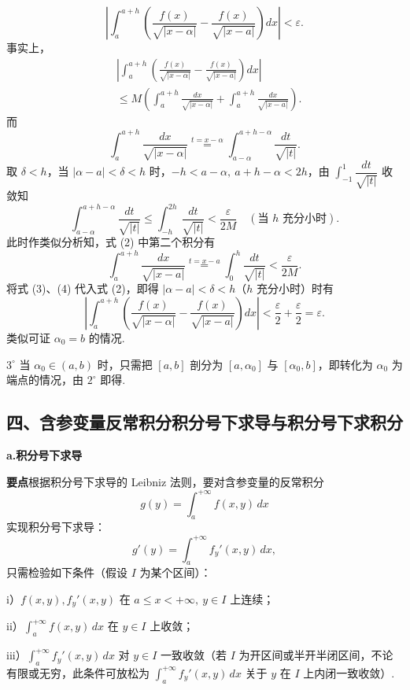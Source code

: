 \documentclass[UTF8,12pt,a4paper,fontset=fandol]{ctexart}
\begin{document}
\[
\left|\int_a^{a+h}\left(\frac{f(x)}{\sqrt{|x-\alpha|}}-\frac{f(x)}{\sqrt{|x-a|}}\right)dx\right|<\varepsilon.
\]
事实上，
\[
\begin{aligned}
&\left|\int_a^{a+h}\left(\frac{f(x)}{\sqrt{|x-\alpha|}}-\frac{f(x)}{\sqrt{|x-a|}}\right)dx\right|\\
&\le M\left(\int_a^{a+h}\frac{dx}{\sqrt{|x-\alpha|}}+\int_a^{a+h}\frac{dx}{\sqrt{|x-a|}}\right).
\end{aligned}
\tag{2}
\]
而
\[
\int_a^{a+h}\frac{dx}{\sqrt{|x-\alpha|}}
\overset{t=x-\alpha}{=}\int_{a-\alpha}^{a+h-\alpha}\frac{dt}{\sqrt{|t|}}.
\]
取 $\delta<h$，当 $|\alpha-a|<\delta<h$ 时，$-h<a-\alpha,\ a+h-\alpha<2h$，由 $\displaystyle\int_{-1}^{1}\dfrac{dt}{\sqrt{|t|}}$ 收敛知
\[
\int_{a-\alpha}^{a+h-\alpha}\frac{dt}{\sqrt{|t|}}
\le\int_{-h}^{2h}\frac{dt}{\sqrt{|t|}}<\frac{\varepsilon}{2M}\quad(\text{当 }h\text{ 充分小时}).
\tag{3}
\]
此时作类似分析知，式 (2) 中第二个积分有
\[
\int_a^{a+h}\frac{dx}{\sqrt{|x-a|}}
\overset{t=x-a}{=}\int_0^h\frac{dt}{\sqrt{|t|}}<\frac{\varepsilon}{2M}.
\tag{4}
\]
将式 (3)、(4) 代入式 (2)，即得 $|\alpha-a|<\delta<h$（$h$ 充分小时）时有
\[
\left|\int_a^{a+h}\left(\frac{f(x)}{\sqrt{|x-\alpha|}}-\frac{f(x)}{\sqrt{|x-a|}}\right)dx\right|<\frac{\varepsilon}{2}+\frac{\varepsilon}{2}=\varepsilon.
\]
类似可证 $\alpha_0=b$ 的情况.

$3^\circ$ 当 $\alpha_0\in(a,b)$ 时，只需把 $[a,b]$ 剖分为 $[a,\alpha_0]$ 与 $[\alpha_0,b]$，即转化为 $\alpha_0$ 为端点的情况，由 $2^\circ$ 即得.

\subsection*{四、含参变量反常积分积分号下求导与积分号下求积分}

\noindent\textbf{a.\quad 积分号下求导}

\noindent\textbf{要点}\quad 根据积分号下求导的 Leibniz 法则，要对含参变量的反常积分
\[
g(y)=\int_a^{+\infty}f(x,y)\,dx
\]
实现积分号下求导：
\[
g'(y)=\int_a^{+\infty}f_y'(x,y)\,dx,
\]
只需检验如下条件（假设 $I$ 为某个区间）：

i）$f(x,y),f_y'(x,y)$ 在 $a\le x<+\infty,\ y\in I$ 上连续；

ii）$\displaystyle\int_a^{+\infty}f(x,y)\,dx$ 在 $y\in I$ 上收敛；

iii）$\displaystyle\int_a^{+\infty}f_y'(x,y)\,dx$ 对 $y\in I$ 一致收敛（若 $I$ 为开区间或半开半闭区间，不论有限或无穷，此条件可放松为 $\displaystyle\int_a^{+\infty}f_y'(x,y)\,dx$ 关于 $y$ 在 $I$ 上内闭一致收敛）.
\end{document}
